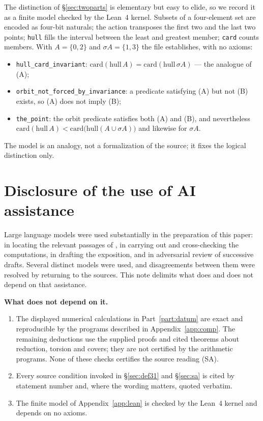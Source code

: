 \documentclass[11pt]{article}
\theoremstyle{plain}
\theoremstyle{definition}
\newcommand{\SA}{\textup{(SA)}}
\begin{document}
The distinction of \S\ref{sec:twoparts} is elementary but easy to elide, so we
record it as a finite model checked by the Lean~4 kernel.  Subsets of a
four-element set are encoded as four-bit naturals; the action transposes the
first two and the last two points; \texttt{hull} fills the interval between the
least and greatest member; \texttt{card} counts members.  With
$A=\{0,2\}$ and $\sigma A=\{1,3\}$ the file establishes, with no axioms:
\begin{itemize}
\item \texttt{hull\_card\_invariant}: $\mathrm{card}(\mathrm{hull}\,A)
  =\mathrm{card}(\mathrm{hull}\,\sigma A)$ --- the analogue of (A);
\item \texttt{orbit\_not\_forced\_by\_invariance}: a predicate satisfying (A) but
  not (B) exists, so (A) does not imply (B);
\item \texttt{the\_point}: the orbit predicate satisfies both (A) and (B), and
  nevertheless $\mathrm{card}(\mathrm{hull}\,A)<
  \mathrm{card}\bigl(\mathrm{hull}(A\cup\sigma A)\bigr)$ and likewise for
  $\sigma A$.
\end{itemize}
The model is an analogy, not a formalization of the source; it fixes the logical
distinction only.

\section{Disclosure of the use of AI assistance}\label{app:ai}

Large language models were used substantially in the preparation of this paper:
in locating the relevant passages of \cite{IUT1,IUT3,IUT4,CanLift,MFHMP}, in
carrying out and cross-checking the computations, in drafting the exposition, and
in adversarial review of successive drafts.  Several distinct models were used,
and disagreements between them were resolved by returning to the sources.  This
note delimits what does and does not depend on that assistance.

\medskip\noindent\textbf{What does not depend on it.}
\begin{enumerate}[label=(\roman*)]
\item The displayed numerical calculations in Part~\ref{part:datum} are
  exact and reproducible by the programs described in Appendix~\ref{app:comp}.
  The remaining deductions use the supplied proofs and cited theorems about
  reduction, torsion and covers; they are not certified by the arithmetic
  programs.  None of these checks certifies the source reading \SA{}.
\item Every source condition invoked in \S\ref{sec:def31} and \S\ref{sec:sa} is
  cited by statement number and, where the wording matters, quoted verbatim.
\item The finite model of Appendix~\ref{app:lean} is checked by the Lean~4
  kernel and depends on no axioms.
\end{enumerate}
\end{document}
